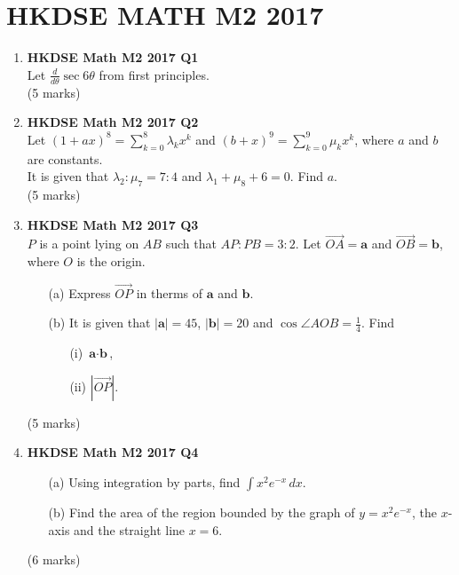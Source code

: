\documentclass{report}
\begin{document}
\chapter{HKDSE MATH M2 2017}
\begin{enumerate}
	\item \textbf{HKDSE Math M2 2017 Q1}\\
	Let $\displaystyle \frac{d}{d\theta} \sec{6\theta}$ from first principles. \\(5 marks)

	\item \textbf{HKDSE Math M2 2017 Q2}\\
	Let $\displaystyle(1+ax)^8 = \sum_{k = 0}^{8} \lambda _{k} x^{k}$ and $\displaystyle(b+x)^9 = \sum_{k = 0}^{9} \mu _{k} x^{k}$, where $a$ and $b$ are constants. \\
	It is given that $\lambda_2 : \mu_7 = 7:4$ and $\lambda_1 + \mu_8  + 6 = 0$. Find $a$.  \\(5 marks)

	\item \textbf{HKDSE Math M2 2017 Q3}\\
	$P$ is a point lying on $AB$ such that $AP : PB = 3:2$. Let $\overrightarrow{OA} = \textbf{a}$ and $\overrightarrow{OB} = \textbf{b}$, where $O$ is the origin.
	\begin{enumerate}
		\item [(a)] Express $\overrightarrow{OP} $ in therms of $ \textbf{a}$ and $ \textbf{b}$.
		\item [(b)] It is given that $|\textbf{a}| = 45$, $|\textbf{b}| = 20$ and $\cos{\angle{AOB}} = \displaystyle\frac{1}{4}$. Find
		\begin{enumerate}
			\item [(i)] $\textbf{a}   \cdot  \textbf{b} $, 
			\item [(ii)] $|\overrightarrow{OP}| $. 
		\end{enumerate}
	\end{enumerate}
	(5 marks)

	\item \textbf{HKDSE Math M2 2017 Q4}	
	\begin{enumerate}
		\item [(a)]Using integration by parts, find $\displaystyle\int x^2 e^{-x} \,dx$. 
		\item [(b)]Find the area of the region bounded by the graph of $y = x^2 e^{-x}$, the $x$-axis and the straight line $x = 6$.
	\end{enumerate}
	(6 marks)


\end{enumerate}
\end{document}
